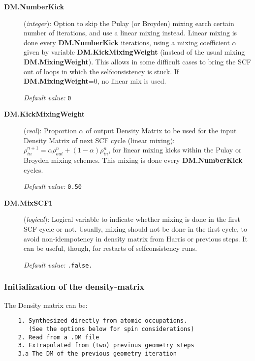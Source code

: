 \documentclass[11pt]{article}
\begin{document}
\begin{description}
\begin{description}
\item[{\bf DM.NumberKick}] ({\it integer}): 
Option to skip the Pulay (or Broyden) mixing earch certain number of iterations,
and use a linear mixing instead. Linear mixing is done
every {\bf DM.NumberKick} iterations, using a mixing coefficient
$\alpha$ given by variable {\bf DM.KickMixingWeight} 
(instead of the usual mixing {\bf DM.MixingWeight}).
This allows in some difficult cases to bring the SCF out of
loops in which the selfconsistency is stuck.
If {\bf DM.MixingWeight}=0, no linear mix is used.

{\it Default value:} {\tt 0}

\item[{\bf DM.KickMixingWeight}] ({\it real}):
Proportion $\alpha$ of 
output Density Matrix to be used for the input Density Matrix of 
next SCF cycle (linear mixing):
$\rho^{n+1}_{in} = \alpha \rho^{n}_{out} 
+(1 - \alpha) \rho^{n}_{in}$, for linear mixing kicks within the
Pulay or Broyden mixing schemes. 
This mixing is done every {\bf DM.NumberKick} cycles.

{\it Default value:} {\tt 0.50}


\item[{\bf DM.MixSCF1}] ({\it logical}):
Logical variable to indicate whether mixing is done in the
first SCF cycle or not. Usually, mixing should not be done in
the first cycle, to avoid non-idempotency in density matrix
from Harris or previous steps. It can be useful, though,
for restarts of selfconsistency runs.

{\it Default value:} {\tt .false.}

\end{description}

\subsubsection{Initialization of the density-matrix}

The Density matrix can be:

\begin{verbatim}
    1. Synthesized directly from atomic occupations.
       (See the options below for spin considerations)
    2. Read from a .DM file
    3. Extrapolated from (two) previous geometry steps
    3.a The DM of the previous geometry iteration


\end{verbatim}
\end{description}
\end{document}
